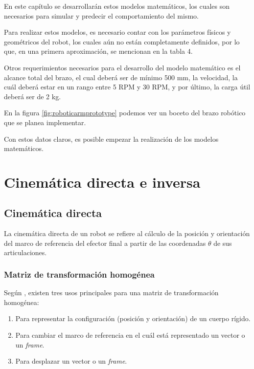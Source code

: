 En este capítulo se desarrollarán estos modelos matemáticos, los cuales son necesarios para simular y predecir el comportamiento del mismo. 

Para realizar estos modelos, es necesario contar con los parámetros físicos y geométricos del robot, los cuales aún no están completamente definidos, por lo que, en una primera aproximación, se mencionan en la tabla 4.


Otros requerimientos necesarios para el desarrollo del modelo matemático es el alcance total del brazo, el cual deberá ser de mínimo 500 mm, la velocidad, la cuál deberá estar en un rango entre 5 RPM y 30 RPM, y por último, la carga útil deberá ser de 2 kg.

En la figura \ref{fig:roboticarmprototype} podemos ver un boceto del brazo robótico que se planea implementar.

Con estos datos claros, es posible empezar la realización de los modelos matemáticos.

\section{Cinemática directa e inversa}
\subsection{Cinemática directa}

La cinemática directa de un robot se refiere al cálculo de la posición y orientación del marco de referencia del efector final a partir de las coordenadas $\theta$ de sus articulaciones. \cite{University2017}

\subsubsection{Matriz de transformación homogénea}

Según \cite{University2017}, existen tres usos principales para una matriz de transformación homogénea:

\begin{enumerate}
  \item Para representar la configuración (posición y orientación) de un cuerpo rígido.
  \item Para cambiar el marco de referencia en el cuál está representado un vector o un \textit{frame}.
  \item Para desplazar un vector o un \textit{frame}.
\end{enumerate}

